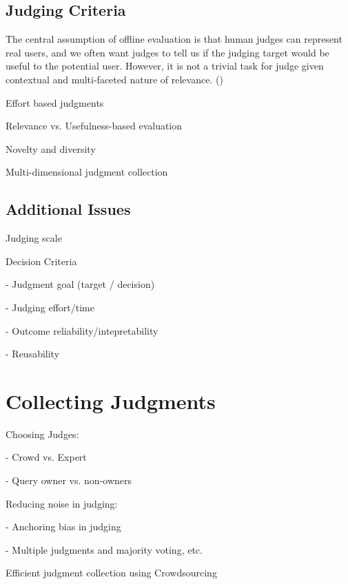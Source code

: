 \documentclass[openany]{now} %
\newcommand{\newpar}{\bigskip\noindent}
\begin{document}
\subsection{Judging Criteria}
The central assumption of offline evaluation is that human judges can represent real users, and we often want judges to tell us if the judging target would be useful to the potential user. However, it is not a trivial task for judge given contextual and multi-faceted nature of relevance. (\cite{Borlund:2003})

\newpar
Effort based judgments \cite{Yilmaz:2014} \cite{VermaYC16}

\newpar
Relevance vs. Usefulness-based evaluation \cite{Zhou:2012} \cite{Kim2016}

\newpar
Novelty and diversity \cite{Chandar2013}

\newpar
Multi-dimensional judgment collection \cite{Golbus:2014:CDR} \cite{Kim:2013}


\subsection{Additional Issues}

\newpar
Judging scale \cite{Turpin2015} \cite{Jarvelin:2002}

\newpar
Decision Criteria

- Judgment goal (target / decision)

- Judging effort/time

- Outcome reliability/intepretability

- Reusability

\section{Collecting Judgments}

Choosing Judges: 

- Crowd vs. Expert \cite{Kazai:2013} \cite{Alonso20121053}

- Query owner vs. non-owners \cite{Chouldechova:2013}

\newpar
Reducing noise in judging: 

- Anchoring bias in judging \cite{Shokouhi:2015}

- Multiple judgments and majority voting, etc. \cite{Venanzi:2014}

\cite{aroyo2013measuring} \cite{aroyo2013crowd}

\newpar
Efficient judgment collection using Crowdsourcing
\end{document}
